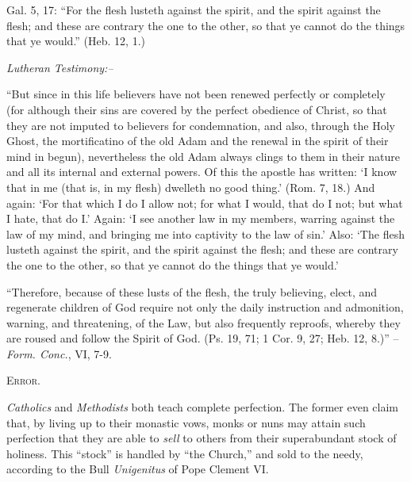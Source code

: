 \documentclass[
]{book}
\begin{document}
Gal. 5, 17: ``For the flesh lusteth against the spirit, and the spirit against the flesh; and these are contrary the one to the other, so that ye cannot do the things that ye would.'' (Heb. 12, 1.)

\begin{center}
\textsl{Lutheran Testimony:--}
\end{center}

``But since in this life believers have not been renewed perfectly or completely (for although their sins are covered by the perfect obedience of Christ, so that they are not imputed to believers for condemnation, and also, through the Holy Ghost, the mortificatino of the old Adam and the renewal in the spirit of their mind in begun), nevertheless the old Adam always clings to them in their nature and all its internal and external powers. Of this the apostle has written: `I know that in me (that is, in my flesh) dwelleth no good thing.' (Rom. 7, 18.) And again: `For that which I do I allow not; for what I would, that do I not; but what I hate, that do I.' Again: `I see another law in my members, warring against the law of my mind, and bringing me into captivity to the law of sin.' Also: `The flesh lusteth against the spirit, and the spirit against the flesh; and these are contrary the one to the other, so that ye cannot do the things that ye would.'

``Therefore, because of these lusts of the flesh, the truly believing, elect, and regenerate children of God require not only the daily instruction and admonition, warning, and threatening, of the Law, but also frequently reproofs, whereby they are roused and follow the Spirit of God. (Ps. 19, 71; 1 Cor. 9, 27; Heb. 12, 8.)'' -- \emph{Form. Conc.}, VI, 7-9.

\begin{center}
\textsc{Error.}
\end{center}

\emph{Catholics} and \emph{Methodists} both teach complete perfection. The former even claim that, by living up to their monastic vows, monks or nuns may attain such perfection that they are able to \emph{sell} to others from their superabundant stock of holiness. This ``stock'' is handled by ``the Church,'' and sold to the needy, according to the Bull \emph{Unigenitus} of Pope Clement VI.
\end{document}
